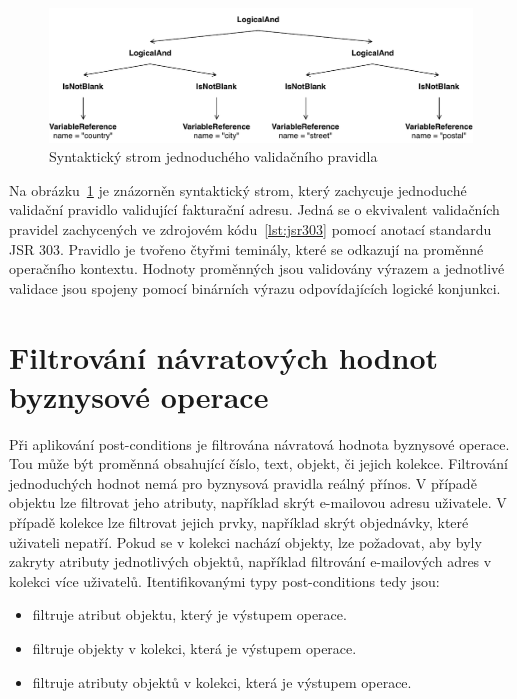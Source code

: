 \begin{figure}
    \centering
    \includegraphics[keepaspectratio=true, width=1\linewidth]{figures/simple-rule.pdf}
    \caption{Syntaktický strom jednoduchého validačního pravidla}
    \label{fig:simple-rule}
\end{figure}

Na obrázku~\ref{fig:simple-rule} je znázorněn syntaktický strom, který zachycuje jednoduché
validační pravidlo validující fakturační adresu. Jedná se o ekvivalent validačních pravidel
zachycených ve zdrojovém kódu~\ref{lst:jsr303} pomocí anotací standardu \gls{JSR} 303.
Pravidlo je tvořeno čtyřmi teminály, které se odkazují na proměnné operačního kontextu.
Hodnoty proměnných jsou validovány výrazem  a jednotlivé validace
jsou spojeny pomocí binárních výrazu  odpovídajících logické konjunkci.

\section{Filtrování návratových hodnot byznysové operace}

Při aplikování post-conditions je filtrována návratová hodnota byznysové operace. Tou může být proměnná
obsahující číslo, text, objekt, či jejich kolekce. Filtrování jednoduchých hodnot nemá pro byznysová pravidla reálný přínos.
V případě objektu lze filtrovat jeho atributy, například skrýt e-mailovou adresu uživatele.
V případě kolekce lze filtrovat jejich prvky, například skrýt objednávky, které uživateli nepatří.
Pokud se v kolekci nachází objekty, lze požadovat, aby byly zakryty atributy jednotlivých objektů,
například filtrování e-mailových adres v kolekci více uživatelů. Itentifikovanými typy post-conditions tedy jsou:

\begin{itemize}
    \item {} filtruje atribut objektu, který je výstupem operace.
    \item {} filtruje objekty v kolekci, která je výstupem operace.
    \item {} filtruje atributy objektů v kolekci, která je výstupem operace.
\end{itemize}

